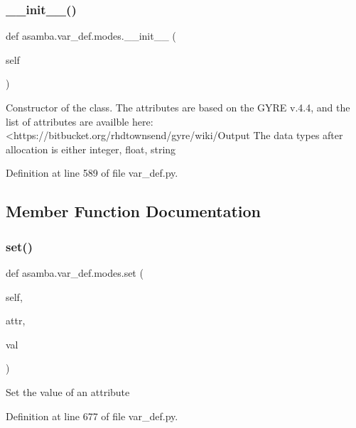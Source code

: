 \subsubsection{\texorpdfstring{\+\_\+\+\_\+init\+\_\+\+\_\+()}{\_\_init\_\_()}}
{\footnotesize\ttfamily def asamba.\+var\+\_\+def.\+modes.\+\_\+\+\_\+init\+\_\+\+\_\+ (\begin{DoxyParamCaption}\item[{}]{self }\end{DoxyParamCaption})}

\begin{DoxyVerb}Constructor of the class. The attributes are based on the GYRE v.4.4, and the list of attributes 
are availble here: <https://bitbucket.org/rhdtownsend/gyre/wiki/Output%
The data types after allocation is either integer, float, string
\end{DoxyVerb}
 

Definition at line 589 of file var\+\_\+def.\+py.



\subsection{Member Function Documentation}
\mbox{\label{classasamba_1_1var__def_1_1modes_a68e3175f54a123a371a9e5345b2cfe6e}} 
\subsubsection{\texorpdfstring{set()}{set()}}
{\footnotesize\ttfamily def asamba.\+var\+\_\+def.\+modes.\+set (\begin{DoxyParamCaption}\item[{}]{self,  }\item[{}]{attr,  }\item[{}]{val }\end{DoxyParamCaption})}

\begin{DoxyVerb}Set the value of an attribute
\end{DoxyVerb}
 

Definition at line 677 of file var\+\_\+def.\+py.

\mbox{\label{classasamba_1_1var__def_1_1modes_a2d9b87e9cdfe54142627a502476bb868}} 
